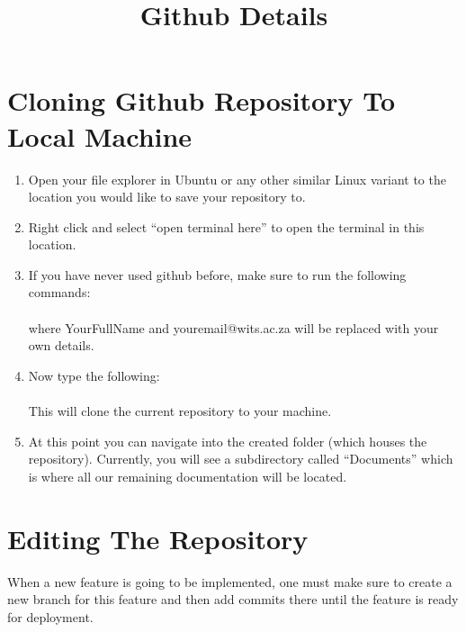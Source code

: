 \documentclass[12pt]{article}
\title{Github Details}
\begin{document}
\maketitle

\section{Cloning Github Repository To Local Machine}
\begin{enumerate}
  \item Open your file explorer in Ubuntu or any other similar Linux variant to the location        you would like to save your repository to.
  \item Right click and select ``open terminal here'' to open the terminal in this location.
  \item If you have never used github before, make sure to run the following commands: \\
\\
  where Your\textunderscore Full\textunderscore Name and youremail@wits.ac.za will be replaced with your own details.
  \item Now type the following: \\
  \\
  This will clone the current repository to your machine.
  
  \item At this point you can navigate into the created folder (which houses the repository). Currently, you will see a subdirectory called ``Documents'' which is where all our remaining documentation will be located.

\end{enumerate}

\section{Editing The Repository}
When a new feature is going to be implemented, one must make sure to create a new branch for this feature and then add commits there until the feature is ready for deployment.
\end{document}
